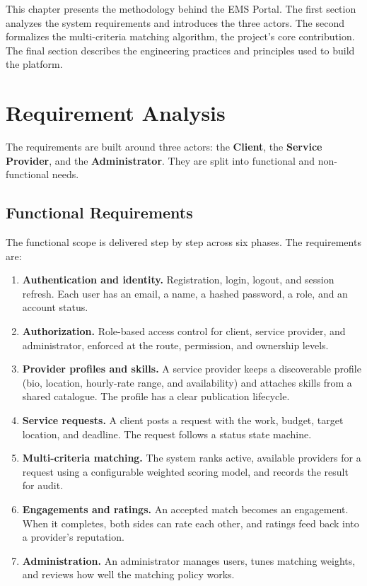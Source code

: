 \label{ch:methodology}

This chapter presents the methodology behind the EMS Portal. The first section
analyzes the system requirements and introduces the three actors. The second
formalizes the multi-criteria matching algorithm, the project's core contribution.
The final section describes the engineering practices and principles used to build
the platform.

\section{Requirement Analysis}
The requirements are built around three actors: the \textbf{Client}, the
\textbf{Service Provider}, and the \textbf{Administrator}. They are split into
functional and non-functional needs.

\subsection{Functional Requirements}
The functional scope is delivered step by step across six phases. The
requirements are:

\begin{enumerate}
	\item \textbf{Authentication and identity.} Registration, login, logout, and
	      session refresh. Each user has an email, a name, a hashed password, a
	      role, and an account status.
	\item \textbf{Authorization.} Role-based access control for client, service
	      provider, and administrator, enforced at the route, permission, and
	      ownership levels.
	\item \textbf{Provider profiles and skills.} A service provider keeps a
	      discoverable profile (bio, location, hourly-rate range, and
	      availability) and attaches skills from a shared catalogue. The profile
	      has a clear publication lifecycle.
	\item \textbf{Service requests.} A client posts a request with the work,
	      budget, target location, and deadline. The request follows a status
	      state machine.
	\item \textbf{Multi-criteria matching.} The system ranks active, available
	      providers for a request using a configurable weighted scoring model, and
	      records the result for audit.
	\item \textbf{Engagements and ratings.} An accepted match becomes an
	      engagement. When it completes, both sides can rate each other, and
	      ratings feed back into a provider's reputation.
	\item \textbf{Administration.} An administrator manages users, tunes matching
	      weights, and reviews how well the matching policy works.
\end{enumerate}

